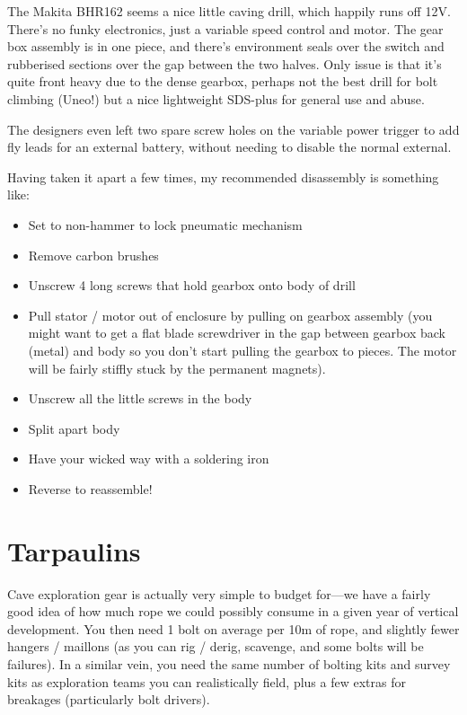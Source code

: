 The Makita BHR162 seems a nice little caving drill, which happily runs
off 12V. There’s no funky electronics, just a variable speed control
and motor. The gear box assembly is in one piece, and there’s
environment seals over the switch and rubberised sections over the gap
between the two halves. Only issue is that it’s quite front heavy due
to the dense gearbox, perhaps not the best drill for bolt climbing
(Uneo!) but a nice lightweight SDS-plus for general use and abuse.

The designers even left two spare screw holes on the variable power
trigger to add fly leads for an external battery, without needing to
disable the normal external.

Having taken it apart a few times, my recommended disassembly is something like:

\begin{itemize}
    \item Set to non-hammer to lock pneumatic mechanism
    \item Remove carbon brushes
    \item Unscrew 4 long screws that hold gearbox onto body of drill
    \item Pull stator / motor out of enclosure by pulling on gearbox assembly (you might want to get a flat blade screwdriver in the gap between gearbox back (metal) and body so you don’t start pulling the gearbox to pieces. The motor will be fairly stiffly stuck by the permanent magnets).
    \item Unscrew all the little screws in the body
    \item Split apart body
    \item Have your wicked way with a soldering iron
    \item Reverse to reassemble!
\end{itemize}


\section{Tarpaulins}
 Cave exploration gear is actually very simple to budget for—we have
a fairly good idea of how much rope we could possibly consume in a
given year of vertical development. You then need 1 bolt on average
per 10m of rope, and slightly fewer hangers / maillons (as you can rig
/ derig, scavenge, and some bolts will be failures). In a similar
vein, you need the same number of bolting kits and survey kits as
exploration teams you can realistically field, plus a few extras for breakages (particularly bolt drivers).

